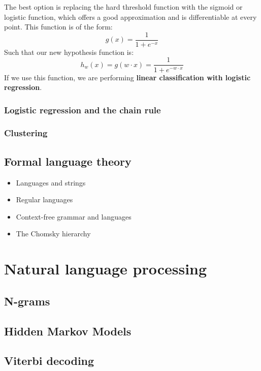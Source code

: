     The best option is replacing the hard threshold function with the
    sigmoid or logistic function, which offers a good approximation and is
    differentiable at every point. This function is of the form:
    \begin{equation}
      g(x) = \frac{1}{1 + e^{-x}}
    \end{equation}
    Such that our new hypothesis function is:
    \begin{equation}
      h_w(x) = g(w \cdot x) = \frac{1}{1 + e^{- w \cdot x}}
    \end{equation}
    If we use this function, we are performing \textbf{linear
      classification with logistic regression}.

\subsubsection{Logistic regression and the chain rule}
\subsubsection{Clustering}


\subsection{Formal language theory}
\label{sec:formalgrammars}
\begin{itemize}
\item Languages and strings
\item Regular languages
\item Context-free grammar and languages
\item The Chomsky hierarchy
\end{itemize}

\section{Natural language processing}
\label{sec:nlp}

\subsection{N-grams}
\label{sec:ngrams}

\subsection{Hidden Markov Models}
\label{sec:hmm-maxent}

\subsection{Viterbi decoding}
\label{sec:viterbi}

